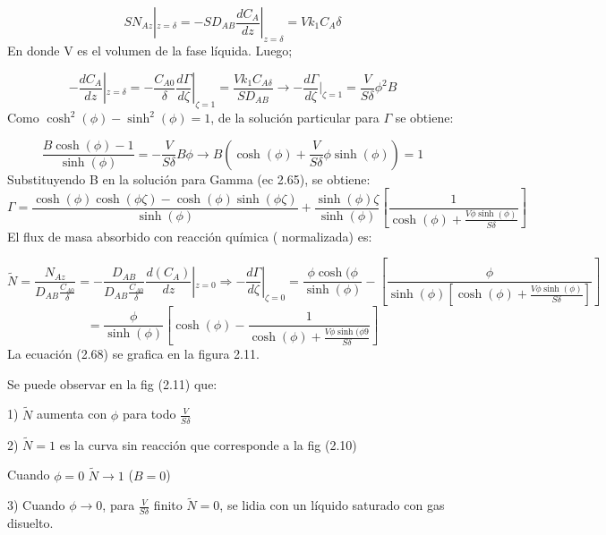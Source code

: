 \begin{equation}
    SN_{Az}|_{z=\delta}=-SD_{AB}\frac{dC_A}{dz}|_{z=\delta}=Vk_1C_A\delta
\end{equation}
En donde V es el volumen de la fase líquida.
Luego;

\begin{equation*}
    -\frac{dC_A}{dz}|_{z=\delta}=-\frac{C_{A0}}{\delta}\frac{d\Gamma}{d\zeta}|_{\zeta=1}=\frac{Vk_1C_{A\delta}}{SD_{AB}}\longrightarrow-\frac{d\Gamma}{d\zeta}|_{\zeta=1}=\frac{V}{S\delta}\phi^2B
\end{equation*}
Como $\cosh^2(\phi)-\sinh^2(\phi)=1$, de la solución particular para $\Gamma$ se obtiene:

\begin{equation*}
    \frac{B\cosh(\phi)-1}{\sinh(\phi)}=-\frac{V}{S\delta}B\phi\longrightarrow B(\cosh(\phi)+\frac{V}{S\delta}\phi\sinh(\phi))=1
\end{equation*}
Substituyendo B en la solución para Gamma (ec 2.65), se obtiene:
\begin{equation}
    \Gamma=\frac{\cosh(\phi)\cosh(\phi\zeta)-\cosh(\phi)\sinh(\phi\zeta)}{\sinh(\phi)}+\frac{\sinh(\phi)\zeta}{\sinh(\phi)}[\frac{1}{\cosh(\phi)+\frac{V\phi\sinh(\phi)}{S\delta}}]
\end{equation}
El flux de masa absorbido con reacción química ( normalizada) es:

\begin{equation*}
    \widetilde{N}=\frac{N_{Az}}{D_{AB}\frac{C_{A0}}{\delta}}=-\frac{D_{AB}}{D_{AB}\frac{C_{A0}}{\delta}}\frac{d(C_A)}{dz}|_{z=0}\Rightarrow-\frac{d\Gamma}{d\zeta}|_{\zeta=0}=\frac{\phi\cosh(\phi}{\sinh(\phi)}-[\frac{\phi}{\sinh(\phi)[\cosh(\phi)+\frac{V\phi\sinh(\phi)}{S\delta}]}]
\end{equation*}
\begin{equation}
    =\frac{\phi}{\sinh(\phi)}[\cosh(\phi)-\frac{1}{\cosh(\phi)+\frac{V\phi\sinh(\phi9}{S\delta}}]
\end{equation}
La ecuación (2.68) se grafica en la figura 2.11.

Se puede observar en la fig (2.11) que:

1) $\widetilde{N}$ aumenta con $\phi$ para todo $\frac{V}{S\delta}$

2) $\widetilde{N}=1$ es la curva sin reacción que corresponde a la fig (2.10)

Cuando $\phi=0$ $\widetilde{N}\rightarrow1$ ($B=0$)


3) Cuando $\phi\rightarrow0$, para $\frac{V}{S\delta}$ finito $\widetilde{N}=0$, se lidia con un líquido saturado con gas disuelto.


